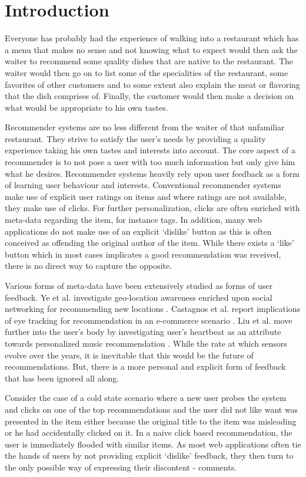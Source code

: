 \chapter{Introduction}
\label{chap:intro}
Everyone has probably had the experience of walking into a restaurant which has a menu that makes no sense and not knowing what to expect would then ask the waiter to recommend some quality dishes that are native to the restaurant. The waiter would then go on to list some of the specialities of the restaurant, some favorites of other customers and to some extent also explain the  meat or flavoring that the dish comprises of. Finally, the customer would then make a decision on what would be appropriate to his own tastes.

Recommender systems are no less different from the waiter of that unfamiliar restaurant. They strive to satisfy the user's needs by providing a quality experience taking his own tastes and interests into account. The core aspect of a recommender is to not pose a user with too much information but only give him what he desires. Recommender systems heavily rely upon user feedback as a form of learning user behaviour and interests. Conventional recommender systems make use of explicit user ratings on items and where ratings are not available, they make use of clicks. For further personalization, clicks are often enriched with meta-data regarding the item, for instance tags. In addition, many web applications do not make use of an explicit `dislike' button as this is often conceived as offending the original author of the item. While there exists a `like' button which in most cases implicates a good recommendation was received, there is no direct way to capture the opposite.

Various forms of meta-data have been extensively studied as forms of user feedback. Ye et al. investigate geo-location awareness enriched upon social networking for recommending new locations \cite{ye_location_2010}.  Castagnos et al. report implications of eye tracking for recommendation in an e-commerce scenario \cite{castagnos_eye-tracking_2010}. Liu et al. move further into the user's body by investigating user's heartbeat as an attribute towards personalized music recommendation \cite{liu_music_2009}. While the rate at which sensors evolve over the years, it is inevitable that this would be the future of recommendations. But, there is a more personal and explicit form of feedback that has been ignored all along. 

Consider the case of a cold state scenario where a new user probes the system and clicks on one of the top recommendations and the user did not like want was presented in the item either because the original title to the item was misleading or he had accidentally clicked on it. In a naive click based recommendation, the user is immediately flooded with similar items. As most web applications often tie the hands of users by not providing explicit `dislike' feedback, they then turn to the only possible way of expressing 
their discontent - comments.

